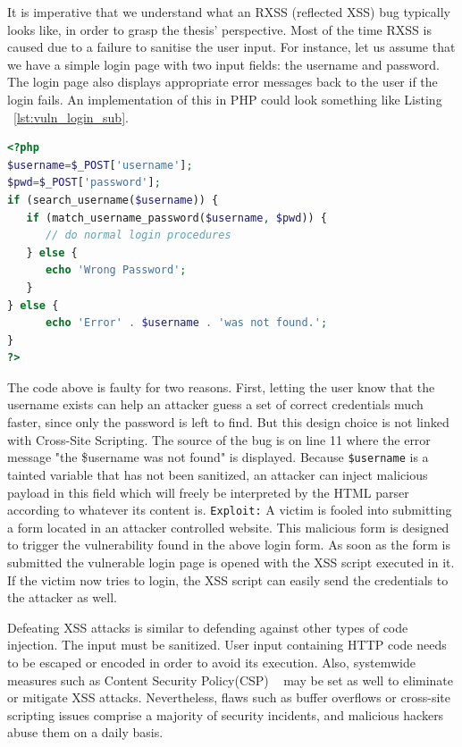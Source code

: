 It is imperative that we understand what an RXSS (reflected XSS) bug typically looks like, in order to grasp the thesis' perspective. Most of the time RXSS is caused due to a failure to sanitise the user input. For instance, let us assume that we have a simple login page with two input fields: the username and password. The login page also displays appropriate error messages back to the user if the login fails. An implementation of this in PHP could look something like Listing ~\ref{lst:vuln_login_sub}.

\begin{lstlisting}[language=PHP, caption={Vulnerable login form.}, numbersep=5pt, label={lst:vuln_login_sub}]
<?php
$username=$_POST['username'];
$pwd=$_POST['password'];
if (search_username($username)) {
   if (match_username_password($username, $pwd)) {
      // do normal login procedures
   } else {
      echo 'Wrong Password';
   }
} else {
      echo 'Error' . $username . 'was not found.';
}
?>
\end{lstlisting}

The code above is faulty for two reasons. First, letting the user know that the username exists can help an attacker guess a set of correct credentials much faster, since only the password is left to find. But this design choice is not linked with Cross-Site Scripting. The source of the bug is on line 11 where the error message "the \$username was not found" is displayed. Because {\tt \$username} is a tainted variable that has not been sanitized, an attacker can inject malicious payload in this field which will freely be interpreted by the HTML parser according to whatever its content is. 
{\tt Exploit:} A victim is fooled into submitting a form located in an attacker controlled website. This malicious form is
designed to trigger the vulnerability found in the above login form. As soon as the form is submitted the vulnerable login
page is opened with the XSS script executed in it. If the victim now tries to login, the XSS script can easily send the
credentials to the attacker as well. 

Defeating XSS attacks is similar to defending against other types of code injection.
The input must be sanitized. User input containing HTTP code needs to be escaped or encoded in order to avoid its execution. Also, systemwide measures
such as Content Security Policy(CSP) ~\cite{csp_def} may be set as well to eliminate or mitigate XSS attacks. Nevertheless, flaws such as buffer overflows or cross-site scripting issues comprise a majority of security incidents, and malicious hackers abuse them on a daily basis. 


